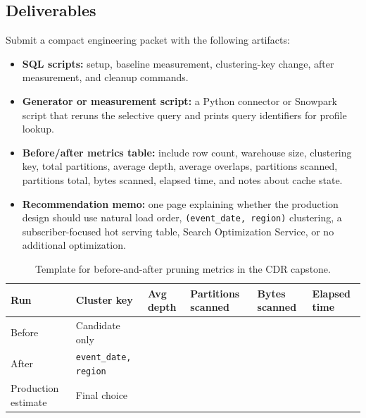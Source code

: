 \subsection*{Deliverables}
Submit a compact engineering packet with the following artifacts:
\begin{itemize}
    \item \textbf{SQL scripts:} setup, baseline measurement, clustering-key change, after measurement, and cleanup commands.
    \item \textbf{Generator or measurement script:} a Python connector or Snowpark script that reruns the selective query and prints query identifiers for profile lookup.
    \item \textbf{Before/after metrics table:} include row count, warehouse size, clustering key, total partitions, average depth, average overlaps, partitions scanned, partitions total, bytes scanned, elapsed time, and notes about cache state.
    \item \textbf{Recommendation memo:} one page explaining whether the production design should use natural load order, \texttt{(event\_date, region)} clustering, a subscriber-focused hot serving table, Search Optimization Service, or no additional optimization.
\end{itemize}

\begin{table}[H]
\centering
\small
\begin{tabular}{@{}p{2.4cm}p{2.0cm}p{2.0cm}p{2.0cm}p{2.0cm}p{2.0cm}@{}}
\toprule
\textbf{Run} & \textbf{Cluster key} & \textbf{Avg depth} & \textbf{Partitions scanned} & \textbf{Bytes scanned} & \textbf{Elapsed time} \\
\midrule
Before & Candidate only & & & & \\
After & \texttt{event\_date, region} & & & & \\
Production estimate & Final choice & & & & \\
\bottomrule
\end{tabular}
\caption{Template for before-and-after pruning metrics in the CDR capstone.}
\label{tab:chapter1-capstone-pruning-metrics}
\end{table}

